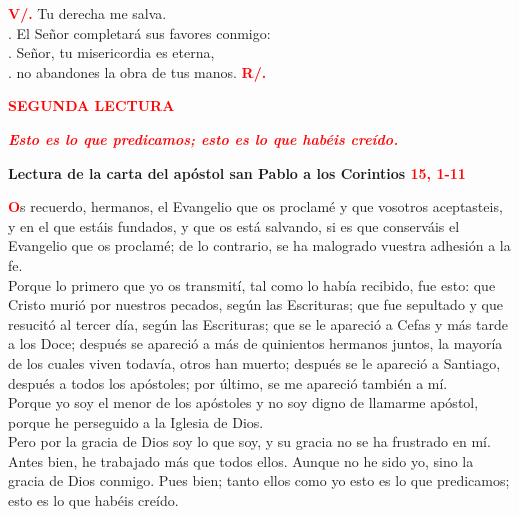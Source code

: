 \documentclass[12pt, letterpaper]{report}
\begin{document}
    {\bfseries \textcolor{red}{V/.}} \hspace{1cm} Tu derecha me salva.\\
    . \hspace{2.5cm} El Se\~nor completar\'a sus favores conmigo:\\
    . \hspace{2.5cm} Se\~nor, tu misericordia es eterna,\\
    . \hspace{2.5cm} no abandones la obra de tus manos.
    \hspace{1cm} {\bfseries \textcolor{red}{R/.}}

    \newpage

    \begin{center}
    \Large {\bfseries \textcolor{red}{SEGUNDA LECTURA}}
    \end{center}

    \begin{center}
    \large {\bfseries \textit{ \textcolor{red}{Esto es lo que predicamos; esto es lo que hab\'eis cre\'ido.}}}
    \end{center}

    \Large {\bfseries Lectura de la carta del ap\'ostol san Pablo a los Corintios \hspace{1cm} \textcolor{red}{15, 1-11}}

    \lettrine[lines=2]{\bfseries \textcolor{red}{O}}{}\Large s recuerdo, hermanos, el Evangelio que os proclam\'e y que vosotros aceptasteis, y en el que est\'ais fundados, y que os est\'a salvando, si es que conserv\'ais el Evangelio que os proclam\'e; de lo contrario, se ha malogrado vuestra adhesi\'on a la fe.\\
    Porque lo primero que yo os transmit\'i, tal como lo hab\'ia recibido, fue esto: que Cristo muri\'o por nuestros pecados, seg\'un las Escrituras; que fue sepultado y que resucit\'o al tercer d\'ia, seg\'un las Escrituras; que se le apareci\'o a Cefas y m\'as tarde a los Doce; despu\'es se apareci\'o a m\'as de quinientos hermanos juntos, la mayor\'ia de los cuales viven todav\'ia, otros han muerto; despu\'es se le apareci\'o a Santiago, despu\'es a todos los ap\'ostoles; por \'ultimo, se me apareci\'o tambi\'en a m\'i.\\
    Porque yo soy el menor de los ap\'ostoles y no soy digno de llamarme ap\'ostol, porque he perseguido a la Iglesia de Dios.\\
    Pero por la gracia de Dios soy lo que soy, y su gracia no se ha frustrado en m\'i. Antes bien, he trabajado m\'as que todos ellos. Aunque no he sido yo, sino la gracia de Dios conmigo. Pues bien; tanto ellos como yo esto es lo que predicamos; esto es lo que hab\'eis cre\'ido.
\end{document}
